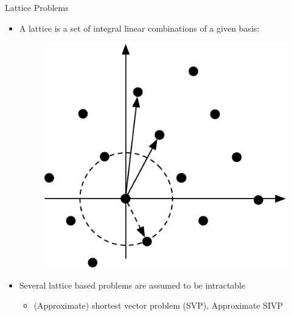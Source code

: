 \begin{frame}{Lattice Problems}
\begin{itemize}
    \item A lattice is a set of integral linear combinations of a given basis:
    \begin{figure}
    \centering
    \includegraphics[width=.5\linewidth]{fig/Lattice.pdf}
    \end{figure}
    \item Several lattice based problems are assumed to be intractable 
    \begin{itemize}
        \item (Approximate) shortest vector problem (SVP), Approximate SIVP
    \end{itemize}
\end{itemize}
\end{frame}

